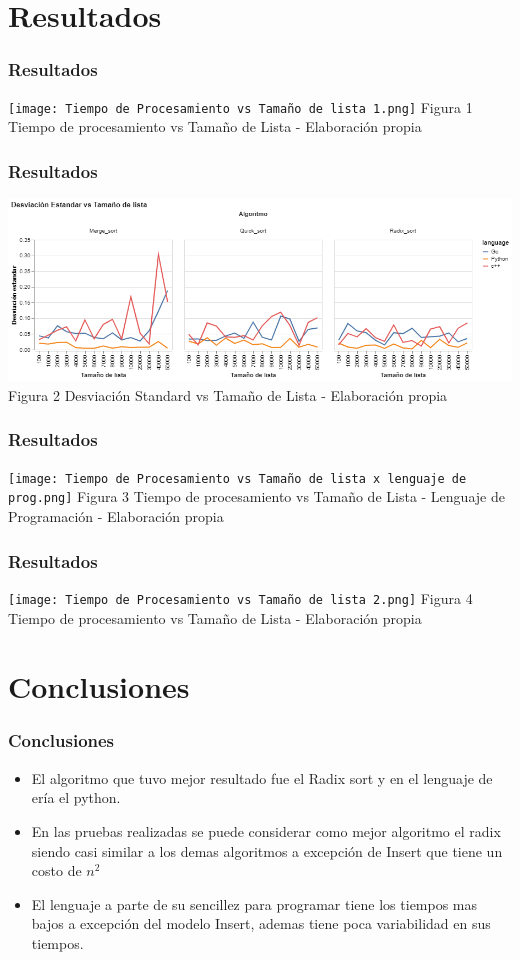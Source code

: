 \documentclass{beamer}
\begin{document}
\section{Resultados}
\begin{frame}
 \frametitle{Resultados}
    \begin{block}{}
\center\texttt{[image: Tiempo de Procesamiento vs Tamaño de lista 1.png]}
\center Figura 1 Tiempo de procesamiento vs Tamaño de Lista - Elaboración propia
  \end{block}
 \end{frame}
\begin{frame}
  \frametitle{Resultados}
  \begin{block}{}
\center\includegraphics[trim={0.1cm 0.2cm 0cm 0.6cm},clip,scale=0.31]{SDvsTL.png}
\center Figura 2 Desviación Standard vs Tamaño de Lista - Elaboración propia
  \end{block}
\end{frame}
\begin{frame}
 \frametitle{Resultados}
    \begin{block}{}
\center\texttt{[image: Tiempo de Procesamiento vs Tamaño de lista x lenguaje de prog.png]}
\center Figura 3 Tiempo de procesamiento vs Tamaño de Lista - Lenguaje de Programación - Elaboración propia
  \end{block}
 \end{frame}
 \begin{frame}
 \frametitle{Resultados}
    \begin{block}{}
\center\texttt{[image: Tiempo de Procesamiento vs Tamaño de lista 2.png]}
\center Figura 4 Tiempo de procesamiento vs Tamaño de Lista - Elaboración propia
  \end{block}
 \end{frame}
\section{Conclusiones}
\begin{frame}
  \frametitle{Conclusiones}
\doublespacing\begin{itemize}
  \item El algoritmo que tuvo mejor resultado fue el Radix sort y en el lenguaje de ería el python.
  \item En las pruebas realizadas se puede considerar como mejor algoritmo el radix siendo casi similar a los demas algoritmos a excepción de Insert que tiene un costo de $n^2$
  \item El lenguaje a parte de su sencillez para programar tiene los tiempos mas bajos a excepción del modelo Insert, ademas tiene poca variabilidad en sus tiempos. 
\end{itemize}
\end{frame}
 
\end{document}
